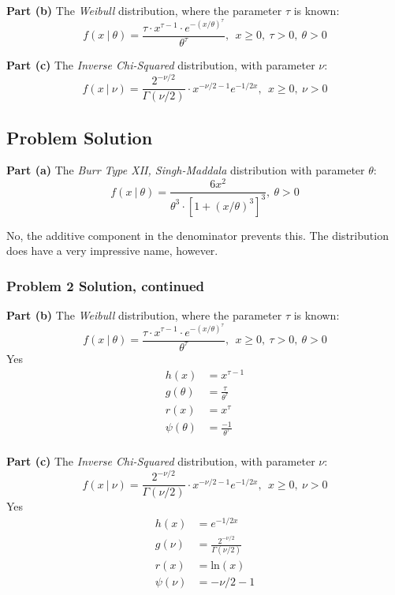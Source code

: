\documentclass[12pt]{article}
\theoremstyle{definition}
\begin{document}
\bigskip
\noindent
{\bf Part (b)} The {\em Weibull} distribution, where the parameter $\tau$ is known:
$$
f(x\ |\ \theta) = \frac{ \tau \cdot x^{\tau - 1} \cdot e^{-(x/\theta)^\tau}}{\theta^\tau},\ \ x \geq 0,\ \tau > 0,\ \theta > 0
$$



\bigskip
\noindent
{\bf Part (c)} The {\em Inverse Chi-Squared} distribution, with parameter $\nu$:
$$
f(x\ |\ \nu) = \frac{ 2^{-\nu/2} }{\Gamma( \nu / 2)} \cdot x^{-\nu/2 - 1} e^{-1/2x},\ \ x \geq 0,\ \nu > 0
$$


\subsection*{Problem Solution}

\noindent
{\bf Part (a)} The {\em Burr Type XII, Singh-Maddala} distribution with parameter $\theta$:
$$
f(x\ |\ \theta) = \frac{ 6 x^2 }{\theta^3 \cdot [1 + (x/\theta)^3]^3},\ \theta > 0
$$

No, the additive component in the denominator prevents this. The distribution does have a very impressive name, however.
\bigskip

\newpage
\subsubsection*{Problem 2 Solution, continued}

\noindent
{\bf Part (b)} The {\em Weibull} distribution, where the parameter $\tau$ is known:
$$
f(x\ |\ \theta) = \frac{ \tau \cdot x^{\tau - 1} \cdot e^{-(x/\theta)^\tau}}{\theta^\tau},\ \ x \geq 0,\ \tau > 0,\ \theta > 0
$$
Yes
\begin{align*}
h(x) &= x^{\tau - 1}\\
g(\theta) &= \frac{\tau}{\theta^\tau}\\
r(x) &= x^\tau\\
\psi(\theta) &= \frac{{-1}}{\theta^\tau}\\
\end{align*}


\vspace{1in}
\noindent
{\bf Part (c)} The {\em Inverse Chi-Squared} distribution, with parameter $\nu$:
$$
f(x\ |\ \nu) = \frac{ 2^{-\nu/2} }{\Gamma( \nu / 2)} \cdot x^{-\nu/2 - 1} e^{-1/2x},\ \ x \geq 0,\ \nu > 0
$$
Yes
\begin{align*}
h(x) &= e^{-1/2x}\\
g(\nu) &=  \frac{ 2^{-\nu/2} }{\Gamma( \nu / 2)}\\
r(x) &= \text{ln}(x)\\
\psi(\nu) &= {-\nu/2 - 1}\\
\end{align*}
\end{document}
